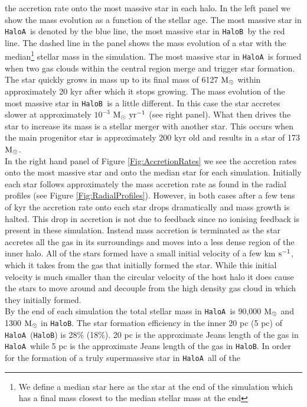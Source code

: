 \documentclass[graphics, twocolumn, usenatbib]{mn2e}
\newcommand{\kms} {km $\rm{s^{-1}}$}
\newcommand{\msolar} {$\rm{M_{\odot}}~$}
\newcommand{\msolarc} {$\rm{M_{\odot}}$}
\newcommand{\msolaryr} {$\rm{M_{\odot}~yr^{-1}}~$}
\newcommand{\ha} {\texttt{HaloA~}}
\newcommand{\hb} {\texttt{HaloB~}}
\newcommand{\hbc} {\texttt{HaloB}}
\begin{document}
the accretion rate onto the most massive star in each halo. In the left panel we show the mass
evolution as a function of the stellar age. The most massive star in \ha is denoted by the blue line,
the most massive star in \hb by the red line. The dashed line in the panel shows the mass evolution
of a star with the median\footnote{We define a
        median star here as the star at the end of the simulation which has a final mass
        closest to the median stellar mass at the end} stellar mass in the simulation. The most massive star in \ha is formed
when two gas clouds within the central region merge and trigger star formation. The star quickly
grows in mass up to its final mass of 6127 \msolar within approximately 20 kyr after which
it stops growing. The mass evolution of the most massive star in
\hb is a little different. In this case the star accretes slower at approximately $10^{-3}$
\msolaryr (see right panel). What then drives the star to increase its mass is a stellar merger
with another star. This occurs when the main progenitor star is approximately 200 kyr old and
results in a star of 173 \msolarc.\\
\indent In the right hand panel of Figure \ref{Fig:AccretionRates} we see the accretion rates onto
the most massive star and onto the median star for each simulation. Initially each star follows approximately the mass accretion rate as found in the radial profiles (see Figure \ref{Fig:RadialProfiles}).
However, in both cases after a few tens of kyr the accretion rate onto each star drops dramatically and mass growth is halted. This drop in accretion is not due to feedback since no ionising feedback
is present in these simulation. Instead mass accretion is terminated as the star accretes all the gas in its surroundings and moves into a less dense region of the inner halo. All of the stars formed have a small initial velocity of a few \kms, which it takes from the gas that initially formed the star. While this 
initial velocity is much smaller than the circular
velocity of the host halo it does cause the stars to move around and decouple from the high density gas cloud in which they initially formed. \\
\indent By the end of each simulation the total stellar mass in \ha is 90,000 \msolar and 1300
\msolar in \hbc. The star formation efficiency in the inner 20 pc (5 pc) of \ha (\hbc) is 28\%
(18\%). 20 pc is the approximate Jeans length of the gas in \ha while 5 pc is the approximate Jeans
length of the gas in \hbc. In order for the formation of a truly supermassive star in \ha all of the
\end{document}
